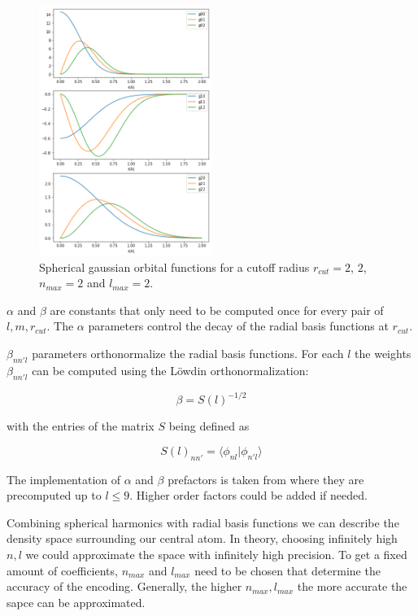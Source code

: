 \begin{figure} [h]
  \centering
  \includegraphics[width=0.5\textwidth]{figures/snap/gaus_orb.png} %
  \caption[Radial basis functions]{Spherical gaussian orbital functions for a cutoff radius $r_{cut}=2$, $2$, $n_{max}=2$ and $l_{max}=2$. }
  \label{fig:gaussians}
\end{figure}

$\alpha$ and $\beta$ are constants that only need to be computed once for every pair of $l,m, r_{cut}$.
The $\alpha$ parameters control the decay of the radial basis functions at $r_{cut}$.

$\beta_{nn'l}$ parameters orthonormalize the radial basis functions.
For each $l$ the weights $\beta_{nn'l}$ can be computed using the Löwdin orthonormalization:

$$\beta = S(l)^{-1/2} $$

with the entries of the matrix $S$ being defined as

$$S(l)_{nn'} = \langle \phi_{nl} | \phi_{n'l} \rangle  $$

The implementation of $\alpha$ and $\beta$ prefactors is taken from \cite{dscribe} where they are precomputed up to $l \leq 9$.
Higher order factors could be added if needed.


Combining spherical harmonics with radial basis functions we can describe the density space surrounding our central atom.
In theory, choosing infinitely high $n, l$ we could approximate the space with infinitely high precision.
To get a fixed amount of coefficients, $n_{max}$ and $l_{max}$ need to be chosen that determine the
accuracy of the encoding.
Generally, the higher $n_{max}, l_{max}$ the more accurate the sapce can be approximated.


